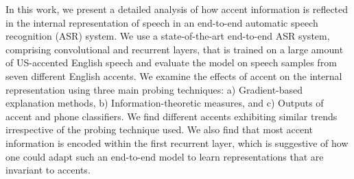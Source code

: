 In this work, we present a detailed analysis of how accent information is reflected in the internal representation of speech in an end-to-end automatic speech recognition (ASR) system. We use a state-of-the-art end-to-end ASR system, comprising convolutional and recurrent layers, that is trained on a large amount of US-accented English speech and evaluate the model on speech samples from seven different English accents. We examine the effects of accent on the internal  representation using three main probing techniques: a) Gradient-based explanation methods, b) Information-theoretic measures, and c) Outputs of accent and phone classifiers. We find different accents exhibiting similar trends irrespective of the probing technique used. We also find that most accent information is encoded within the first recurrent layer, which is suggestive of how one could adapt such an end-to-end model to learn representations that are invariant to accents.
